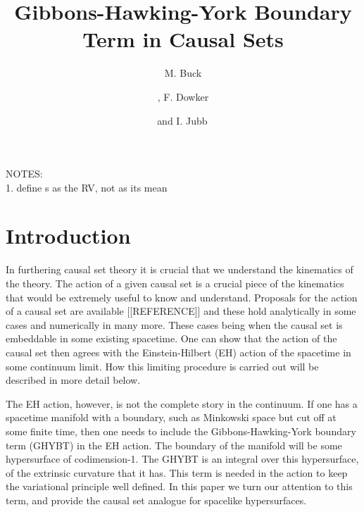 \documentclass[12pt]{article}
\title{Gibbons-Hawking-York Boundary Term in Causal Sets}
\author[a]{M. Buck}
\author[a,b]{\!, F. Dowker}
\author[a]{and I. Jubb\,}
\affiliation[a]{Theoretical Physics Group, Blackett Laboratory, Imperial College, London, SW7 2AZ, U.K.}
\affiliation[b]{Institute for Quantum Computing, University of Waterloo, ON, N2L 2Y5, Canada}
\begin{document}
\maketitle


\noindent NOTES:\\
1. define s as the RV, not as its mean

\section{Introduction}


In furthering causal set theory it is crucial that we understand the kinematics of the theory. The action of a given causal set is a crucial piece of the kinematics that would be extremely useful to know and understand. Proposals for the action of a causal set are available [[REFERENCE]] and these hold analytically in some cases and numerically in many more. These cases being when the causal set is embeddable in some existing spacetime. One can show that the action of the causal set then agrees with the Einstein-Hilbert (EH) action of the spacetime in some continuum limit. How this limiting procedure is carried out will be described in more detail below.

The EH action, however, is not the complete story in the continuum. If one has a spacetime manifold with a boundary, such as Minkowski space but cut off at some finite time, then one needs to include the Gibbons-Hawking-York boundary term (GHYBT) in the EH action. The boundary of the manifold will be some hypersurface of codimension-1. The GHYBT is an integral over this hypersurface, of the extrinsic curvature that it has. This term is needed in the action to keep the variational principle well defined. In this paper we turn our attention to this term, and provide the causal set analogue for spacelike hypersurfaces.
\end{document}
